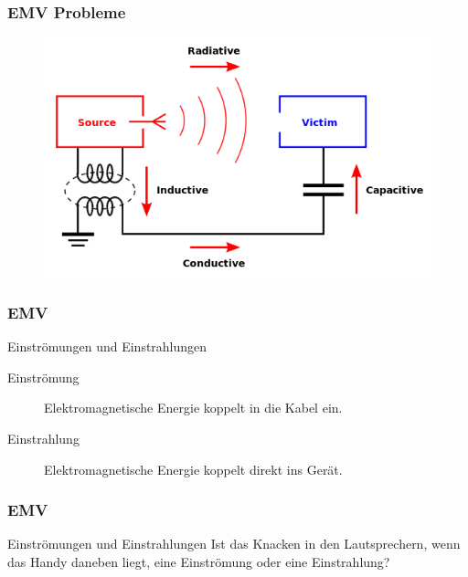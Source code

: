 \begin{frame}
  \frametitle{EMV Probleme}
  \begin{center}
    \begin{figure}
      \includegraphics[width=1\textwidth,height=.7\textheight,keepaspectratio]{a19/EMI_coupling_modes.png}
    \end{figure}
  \end{center}
\end{frame}

\begin{frame}
  \frametitle{EMV}
  \begin{center}
    \begin{block}{Einströmungen und Einstrahlungen}
      \begin{description}
        \item[Einströmung] Elektromagnetische Energie koppelt in die Kabel ein. \\
        \item[Einstrahlung] Elektromagnetische Energie koppelt direkt ins Gerät.
      \end{description}
    \end{block}
  \end{center}
\end{frame}

\begin{frame}
  \frametitle{EMV}
  \begin{center}
    \begin{exampleblock}{Einströmungen und Einstrahlungen}
      Ist das Knacken in den Lautsprechern, wenn das Handy daneben liegt, eine Einströmung oder eine Einstrahlung?
    \end{exampleblock}
  \end{center}
\end{frame}

